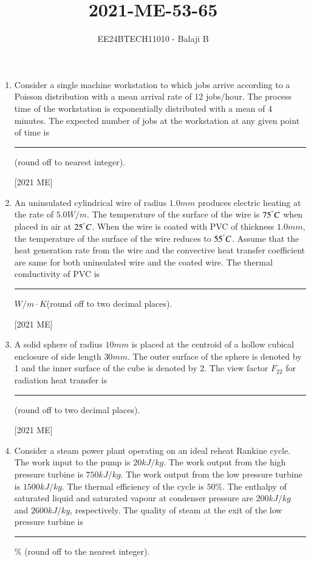 \documentclass[journal]{IEEEtran}
\begin{document}

\vspace{3cm}

\title{2021-ME-53-65}
\author{EE24BTECH11010 - Balaji B}
{\let\newpage\relax\maketitle}
\begin{enumerate}
\item Consider a single machine workstation to which jobs arrive according to a
Poisson distribution with a mean arrival rate of 12 jobs/hour. The process
time of the workstation is exponentially distributed with a mean of 4
minutes. The expected number of jobs at the workstation at any given
point of time is \rule{2cm}{0.4pt} (round off to nearest integer).

\hfill [2021 ME]
    \item An uninsulated cylindrical wire of radius $1.0 mm$ produces electric heating
at the rate of $5.0 W/m$. The temperature of the surface of the wire is $75 ^\degree C$
when placed in air at $25 ^\degree C$. When the wire is coated with PVC of thickness
$1.0 mm$, the temperature of the surface of the wire reduces to $55 ^\degree C$.
Assume that the heat generation rate from the wire and the convective heat
transfer coefficient are same for both uninsulated wire and the coated wire.
The thermal conductivity of PVC is \rule{2cm}{0.4pt} $W/m\cdot K$(round off to two decimal places). 

\hfill [2021 ME]
\item A solid sphere of radius $10 mm$ is placed at the centroid of a hollow cubical
enclosure of side length $30 mm$. The outer surface of the sphere is denoted
by 1 and the inner surface of the cube is denoted by 2. The view factor $F_{22}$
for radiation heat transfer is \rule{2cm}{0.4pt} (round off to two decimal places).

\hfill [2021 ME]
\item Consider a steam power plant operating on an ideal reheat Rankine cycle.
The work input to the pump is $20 kJ/kg$. The work output from the high
pressure turbine is $750 kJ/kg$. The work output from the low pressure
turbine is $1500 kJ/kg$. The thermal efficiency of the cycle is $50 \% $. The
enthalpy of saturated liquid and saturated vapour at condenser pressure
are $200 kJ/kg$ and $2600 kJ/kg$, respectively. The quality of steam at the exit
of the low pressure turbine is \rule{2cm}{0.4pt} $\%$ (round off to the nearest integer). 


\end{enumerate}
\end{document}
